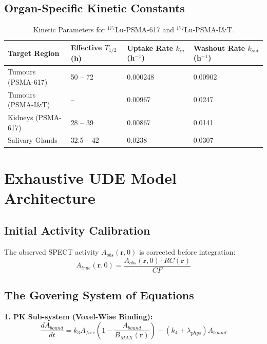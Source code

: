 \documentclass[11pt,a4paper]{article}
\begin{document}
\subsection{Organ-Specific Kinetic Constants}
\begin{table}[h!]
\centering
\caption{Kinetic Parameters for $^{177}$Lu-PSMA-617 and $^{177}$Lu-PSMA-I\&T.}
\begin{tabular}{@{}llll@{}}
\toprule
\textbf{Target Region} & \textbf{Effective $T_{1/2}$ (h)} & \textbf{Uptake Rate $k_{in}$ (h$^{-1}$)} & \textbf{Washout Rate $k_{out}$ (h$^{-1}$)} \\ \midrule
Tumours (PSMA-617) & 50 -- 72 \cite{PetersHofferber2021} & 0.000248 \cite{SiebingaPriv2023} & 0.00902 \cite{SiebingaPriv2023} \\
Tumours (PSMA-I\&T) & -- & 0.00967 \cite{SiebingaVeen2024} & 0.0247 \cite{SiebingaVeen2024} \\
Kidneys (PSMA-617) & 28 -- 39 \cite{PetersHofferber2021} & 0.00867 \cite{SiebingaPriv2023} & 0.0141 \cite{SiebingaPriv2023} \\
Salivary Glands & 32.5 -- 42 \cite{PetersPriv2021} & 0.0238 \cite{SiebingaPriv2023} & 0.0307 \cite{SiebingaPriv2023} \\
\bottomrule
\end{tabular}
\end{table}

\section{Exhaustive UDE Model Architecture}

\subsection{Initial Activity Calibration}
The observed SPECT activity $A_{obs}(\mathbf{r}, 0)$ is corrected before integration:
\begin{equation}
    A_{true}(\mathbf{r}, 0) = \frac{A_{obs}(\mathbf{r}, 0) \cdot RC(\mathbf{r})}{CF}
\end{equation}

\subsection{The Govering System of Equations}
\textbf{1. PK Sub-system (Voxel-Wise Binding):}
\begin{equation}
    \frac{dA_{bound}}{dt} = k_3 A_{free} \left( 1 - \frac{A_{bound}}{B_{MAX}(\mathbf{r})} \right) - (k_4 + \lambda_{phys}) A_{bound}
\end{equation}
\end{document}
